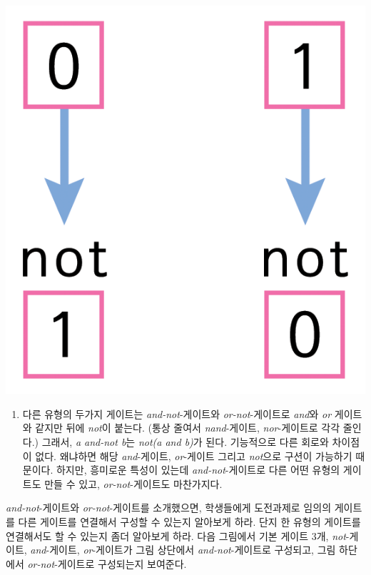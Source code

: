 \documentclass[]{article}
\begin{document}
\includegraphics{csunplugged/05-part/img/ch18-crypto/17-crypto-07-boole.png}

\begin{enumerate}
\itemsep1pt\parskip0pt
\item
  다른 유형의 두가지 게이트는 \emph{and-not}-게이트와
  \emph{or-not}-게이트로 \emph{and}와 \emph{or} 게이트와 같지만 뒤에
  \emph{not}이 붙는다. (통상 줄여서 \emph{nand}-게이트,
  \emph{nor}-게이트로 각각 줄인다.) 그래서, \emph{a and-not b}는
  \emph{not(a and b)}가 된다. 기능적으로 다른 회로와 차이점이 없다.
  왜냐하면 해당 \emph{and}-게이트, \emph{or}-게이트 그리고
  \emph{not}으로 구션이 가능하기 때문이다. 하지만, 흥미로운 특성이
  있는데 \emph{and-not}-게이트로 다른 어떤 유형의 게이트도 만들 수 있고,
  \emph{or-not}-게이트도 마찬가지다.
\end{enumerate}

\emph{and-not}-게이트와 \emph{or-not}-게이트를 소개했으면, 학생들에게
도전과제로 임의의 게이트를 다른 게이트를 연결해서 구성할 수 있는지
알아보게 하라. 단지 한 유형의 게이트를 연결해서도 할 수 있는지 좀더
알아보게 하라. 다음 그림에서 기본 게이트 3개, \emph{not}-게이트,
\emph{and}-게이트, \emph{or}-게이트가 그림 상단에서
\emph{and-not}-게이트로 구성되고, 그림 하단에서 \emph{or-not}-게이트로
구성되는지 보여준다.
\end{document}
